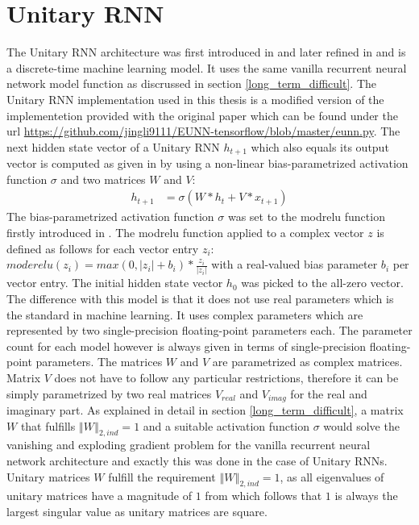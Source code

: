 \documentclass[draft,final]{vutinfth} %
\begin{document}
    \section{Unitary RNN} \label{urnn}
    The Unitary RNN architecture was first introduced in \cite{UnitaryRNNs} and later refined in \cite{EfficientUnitaryRNNs} and is a discrete-time machine learning model.
    It uses the same vanilla recurrent neural network model function as discrussed in section \ref{long_term_difficult}.
    The Unitary RNN implementation used in this thesis is a modified version of the implementetion provided with the original paper which can be found under the url \url{https://github.com/jingli9111/EUNN-tensorflow/blob/master/eunn.py}.
    The next hidden state vector of a Unitary RNN $h_{t+1}$ which also equals its output vector is computed as given in \cite[p. 2]{EfficientUnitaryRNNs} by using a non-linear bias-parametrized activation function $\sigma$ and two matrices $W$ and $V$:
    \begin{align}
    \label{urnn_state}
    h_{t+1} &= \sigma(W*h_t + V*x_{t+1})
    \end{align}
    The bias-parametrized activation function $\sigma$ was set to the modrelu function firstly introduced in \cite[p. 4]{UnitaryRNNs}.
    The modrelu function applied to a complex vector $z$ is defined as follows for each vector entry $z_i$: $moderelu(z_i) = max(0, |z_i|+b_i) * \frac{z_i}{|z_i|}$ with a real-valued bias parameter $b_i$ per vector entry.
    The initial hidden state vector $h_0$ was picked to the all-zero vector.
    The difference with this model is that it does not use real parameters which is the standard in machine learning.
    It uses complex parameters which are represented by two single-precision floating-point parameters each. 
    The parameter count for each model however is always given in terms of single-precision floating-point parameters.
    The matrices $W$ and $V$ are parametrized as complex matrices. 
    Matrix $V$ does not have to follow any particular restrictions, therefore it can be simply parametrized by two real matrices $V_{real}$ and $V_{imag}$ for the real and imaginary part. 
    As explained in detail in section \ref{long_term_difficult}, a matrix $W$ that fulfills $\left\Vert W \right\Vert_{2,ind} = 1$ and a suitable activation function $\sigma$ would solve the vanishing and exploding gradient problem for the vanilla recurrent neural network architecture and exactly this was done in the case of Unitary RNNs. 
    Unitary matrices $W$ fulfill the requirement $\left\Vert W \right\Vert_{2,ind} = 1$, as all eigenvalues of unitary matrices have a magnitude of $1$ from which follows that $1$ is always the largest singular value as unitary matrices are square. 
\end{document}
